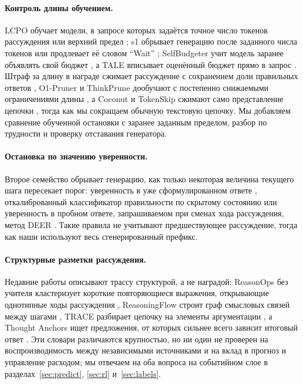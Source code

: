 \documentclass[11pt]{article}
\begin{document}
\paragraph{Контроль длины обучением.} LCPO обучает модели, в запросе которых задаётся точное число токенов рассуждения или верхний предел \citep{aggarwal2025l1}; s1 обрывает генерацию после заданного числа токенов или продлевает её словом ``Wait'' \citep{muennighoff2025s1}; SelfBudgeter учит модель заранее объявлять свой бюджет \citep{li2025selfbudgeter}, а TALE вписывает оценённый бюджет прямо в запрос \citep{han2024tale}. Штраф за длину в награде сжимает рассуждение с сохранением доли правильных ответов \citep{arora2025efficient,yang2025thinkingoptimal,xiang2025alp,lyu2025hbpo}, O1-Pruner и ThinkPrune дообучают с постепенно снижаемыми ограничениями длины \citep{luo2025o1pruner,hou2025thinkprune}, а Coconut и TokenSkip сжимают само представление цепочки \citep{hao2024coconut,xia2025tokenskip}, тогда как мы сокращаем обычную текстовую цепочку. Мы добавляем сравнение обученной остановки с заранее заданным пределом, разбор по трудности и проверку отставания генератора.

\paragraph{Остановка по значению уверенности.} Второе семейство обрывает генерацию, как только некоторая величина текущего шага пересекает порог: уверенность в уже сформулированном ответе \citep{jurayj2025final}, откалиброванный классификатор правильности по скрытому состоянию \citep{zhang2025knowwhenright} или уверенность в пробном ответе, запрашиваемом при сменах хода рассуждения, метод DEER \citep{yang2025deer}. Такие правила не учитывают предшествующее рассуждение, тогда как наши используют весь сгенерированный префикс.

\paragraph{Структурные разметки рассуждения.} Недавние работы описывают трассу структурой, а не наградой: ReasonOps без учителя кластеризует короткие повторяющиеся выражения, открывающие однотипные ходы рассуждения \citep{lee2026reasonops}, ReasoningFlow строит граф смысловых связей между шагами \citep{lee2026reasoningflow}, TRACE разбирает цепочку на элементы аргументации \citep{kim2026trace}, а Thought Anchors ищет предложения, от которых сильнее всего зависит итоговый ответ \citep{bogdan2025thoughtanchors}. Эти словари различаются крупностью, но ни один не проверен на воспроизводимость между независимыми источниками и на вклад в прогноз и управление расходом; мы отвечаем на оба вопроса на событийном слое в разделах~\ref{sec:predict}, \ref{sec:rl} и~\ref{sec:labels}.
\end{document}
